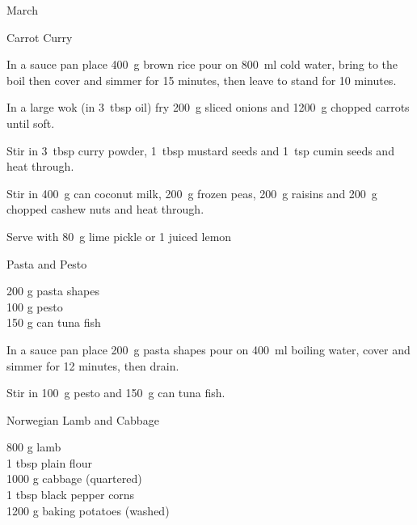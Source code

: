 \begin{menu}{March}
\begin{recipe}{2}{Carrot Curry}
    \begin{instructions}
    \item 
    In a
    sauce pan
    place
    400~g  brown rice
    pour on
    800~ml  cold water,
    bring to the boil then cover and simmer for 15 minutes,
    then leave to stand for 10 minutes.
  \item 
        In a large wok
        (in 3~tbsp  oil)
        fry
        200~g sliced onions
        and
        1200~g chopped carrots
        until soft.
      \item 
        Stir in
        3~tbsp  curry powder,
        1~tbsp  mustard seeds
        and
        1~tsp  cumin seeds
        and heat through.
      \item 
        Stir in
        400~g  can coconut milk,
        200~g  frozen peas,
        200~g  raisins
        and
        200~g chopped cashew nuts
        and heat through.
      \item 
        Serve with 80~g  lime pickle
        or
        1 juiced lemon
    \end{instructions}
    \end{recipe}%
  
    \begin{recipe}{1}{Pasta and Pesto}%
		\begin{ingredients}
		200 g pasta shapes  \\
	100 g pesto  \\
	150 g can tuna fish  \\
	
		\end{ingredients}
	
	
    \begin{instructions}
    \item 
    In a
    sauce pan
    place
    200~g  pasta shapes
    pour on
    400~ml  boiling water,
    cover and simmer for 12 minutes, then drain.
  \item 
        Stir in
        100~g  pesto and
        150~g  can tuna fish.
      
    \end{instructions}
    \end{recipe}%
  
    \begin{recipe}{2}{Norwegian Lamb and Cabbage}%
		\begin{ingredients}
		800 g lamb  \\
	1 tbsp plain flour  \\
	1000 g cabbage (quartered) \\
	1 tbsp black pepper corns  \\
	1200 g baking potatoes (washed) \\
	

\end{ingredients}
\end{recipe}
\end{menu}
